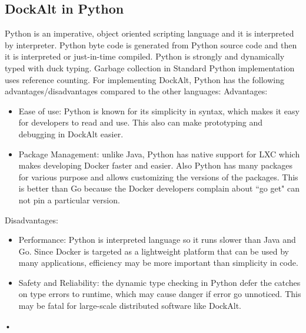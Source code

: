 \documentclass[letterpaper,twocolumn,10pt]{article}
\begin{document}
\subsection{DockAlt in Python}
Python is an imperative, object oriented scripting language and it is interpreted by interpreter. Python byte code is generated from Python source code and then it is interpreted or just-in-time compiled. Python is strongly and dynamically typed with duck typing. Garbage collection in Standard Python implementation uses reference counting. For implementing DockAlt, Python has the following advantages/disadvantages compared to the other languages:\newline
Advantages:
\begin{itemize}
\item Ease of use: Python is known for its simplicity in syntax, which makes it easy for developers to read and use.
This also can make prototyping and debugging in DockAlt easier.
\item Package Management: unlike Java, Python has native support for LXC which makes developing Docker faster and easier. Also Python has many packages for various purpose and allows customizing the versions of the packages. This is better than Go because the Docker developers complain about ``go get" can not pin a particular version.
\end{itemize}
Disadvantages:
\begin{itemize} 
\item Performance: Python is interpreted language so it runs slower than Java and Go. Since Docker is targeted as a lightweight platform that can be used by many applications, efficiency may be more important than simplicity in code.
\item Safety and Reliability: the dynamic type checking in Python defer the catches on type errors to runtime, which may cause danger if error go unnoticed. This may be fatal for large-scale distributed software like DockAlt. 

\end{itemize}•
\end{document}

